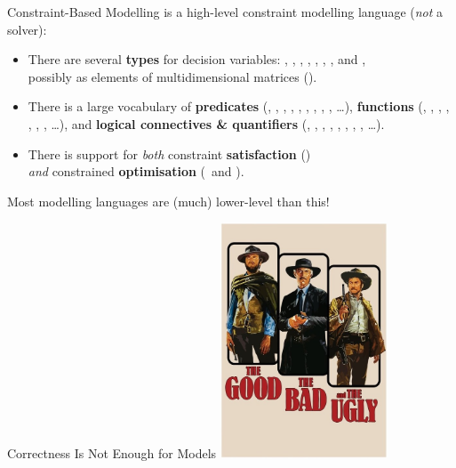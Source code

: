 \documentclass{cons-beamer}
\begin{document}
\begin{flashcardminizinc}
	\begin{frame}{Constraint-Based Modelling}
		 is a high-level constraint modelling \alert{language} (\emph{not} a solver): \vfill
		\begin{itemize}
			\item There are several \textbf{types} for decision variables:
			, , ,
			, , ,
			, and , \\ possibly as elements
			of multidimensional matrices (). \vfill
			\item There is a large vocabulary of \textbf{predicates}
			(\mzninline{<}, \mzninline{<=}, \mzninline{=}, \mzninline{!=},
			\mzninline{>=}, \mzninline{>}, ,
			, , \dots),
			\textbf{functions} (\mzninline{$+$}, \mzninline{$-$},
			\mzninline{*},
			, , ,
			, \dots), and \textbf{logical connectives \&
				quantifiers} (, \mzninline{/\\}, \mzninline{\\/},
			\mzninline{->}, \mzninline{<-}, \mzninline{<->},
			, , \dots).  \vfill
			\item There is support for \emph{both} constraint
			\textbf{satisfaction} () \\ \emph{and}
			constrained \textbf{optimisation} (~and
			).
		\end{itemize}\vfill
		Most modelling languages are (much) lower-level than this!
	\end{frame}
\end{flashcardminizinc}


\begin{frame}{Correctness Is Not Enough for Models}
  \centering
  \includegraphics[height=70mm]{images/GoodBadUgly}
\end{frame}
\end{document}
